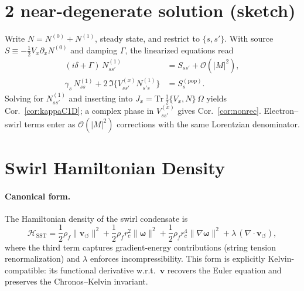 \documentclass[reprint,aps,onecolumn,nofootinbib]{revtex4-2}
\begin{document}
\section*{ 2 near-degenerate solution (sketch)}
Write $N=N^{(0)}+N^{(1)}$, steady state, and restrict to $\{s,s'\}$. With source $S\equiv -\tfrac12 V_x\partial_x N^{(0)}$ and damping $\Gamma$, the linearized equations read
\begin{align}
(i\delta+\Gamma)\,N^{(1)}_{ss'} &= S_{ss'} + \mathcal O(|M|^2),\\
\gamma_s\,N^{(1)}_{ss} + 2\,\Im\{V^{(x)}_{ss'}N^{(1)}_{s's}\} &= S^{(\mathrm{pop})}_s.
\end{align}
Solving for $N^{(1)}_{ss'}$ and inserting into $J_x=\mathrm{Tr}\,\tfrac12\{V_x,N\}\,\Omega$ yields Cor.~\ref{cor:kappaC1D}; a complex phase in $V^{(x)}_{ss'}$ gives Cor.~\ref{cor:nonrec}. Electron–swirl terms enter as $\mathcal O(|M|^2)$ corrections with the same Lorentzian denominator.






    \section{Swirl Hamiltonian Density}
    \label{canon58:appA}
    \paragraph{Canonical form.}
        The Hamiltonian density of the swirl condensate is
        \[
            \mathcal{H}_{\mathrm{SST}} =
            \frac{1}{2} \rho_{\!f} \lVert \mathbf{v}_{\!\boldsymbol{\circlearrowleft}}\rVert^2
            + \frac{1}{2} \rho_{\!f} r_c^{2} \lVert \boldsymbol{\omega} \rVert^{2}
            + \frac{1}{2} \rho_{\!f} r_c^{4} \lVert \nabla \boldsymbol{\omega} \rVert^{2}
            + \lambda\,(\nabla \cdot \mathbf{v}_{\!\boldsymbol{\circlearrowleft}}),
        \]
        where the third term captures gradient-energy contributions (string tension renormalization)
        and $\lambda$ enforces incompressibility. This form is explicitly Kelvin-compatible:
        its functional derivative w.r.t.\ $\mathbf{v}$ recovers the Euler equation and preserves
        the Chronos–Kelvin invariant.
\end{document}
